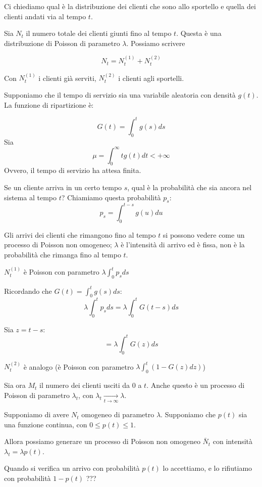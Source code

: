 \documentclass[a4paper,12pt]{book}
\begin{document}
Ci chiediamo qual è la distribuzione dei clienti che sono allo sportello e quella dei clienti andati via al tempo $ t $. 

Sia $ N_t $ il numero totale dei clienti giunti fino al tempo $ t $. Questa è una distribuzione di Poisson di parametro $\lambda$. Possiamo scrivere

$$ N_t = N_t^{(1)} + N_t^{(2)}$$

Con $ N_t^{(1)} $ i clienti già serviti, $ N_t^{(2)} $ i clienti agli sportelli.

Supponiamo che il tempo di servizio sia una variabile aleatoria con densità $ g(t) $. La funzione di ripartizione è:

$$ G(t) = \int_{0}^{t} g(s) ds $$
Sia 
$$ \mu = \int_0^{\infty} t g(t) dt < + \infty $$
Ovvero, il tempo di servizio ha attesa finita. 

Se un cliente arriva in un certo tempo $ s $, qual è la probabilità che sia ancora nel sistema al tempo $ t $? Chiamiamo questa probabilità $ p_s $:
$$ p_s = \int_{0}^{t-s} g(u) du $$

Gli arrivi dei clienti che rimangono fino al tempo $ t $ si possono vedere come un processo di Poisson non omogeneo; $\lambda$ è l'intensità di arrivo ed è fissa, non è la probabilità che rimanga fino al tempo $ t $. 

$ N_t^{(1)} $ è Poisson con parametro $\lambda \int_{0}^{t} p_s ds$

Ricordando che $ G(t) = \int_{0}^{t} g(s) ds $:
$$ \lambda\int_{0}^{t} p_s ds = \lambda\int_{0}^{t} G(t-s) ds $$

Sia $ z = t - s $:
$$ = \lambda\int_{0}^{t} G(z) ds $$

$ N_t^{(2)} $ è analogo (è Poisson con parametro $\lambda \int_{0}^{t} (1 - G(z) dz)$) %

Sia ora $ M_t $ il numero dei clienti usciti da 0 a $ t $. Anche questo è un processo di Poisson di parametro $\lambda_t$, con $\lambda_t \underset{t \to \infty }{\longrightarrow} \lambda$.

Supponiamo di avere $ N_t $ omogeneo di parametro $\lambda$. Supponiamo che $ p(t) $ sia una funzione continua, con $ 0 \le p(t) \le 1 $.

Allora possiamo generare un processo di Poisson non omogeneo $\bar{N}_t$ con intensità $\lambda_t = \lambda p(t)$. 

Quando si verifica un arrivo con probabilità $ p(t) $ lo accettiamo, e lo rifiutiamo con probabilità $ 1 - p(t) $ ??? %
\end{document}
